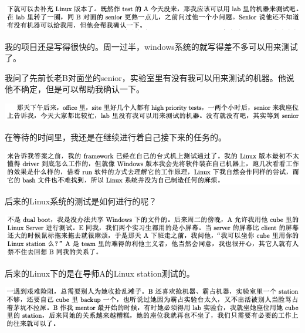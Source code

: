 \documentclass[9pt, b5paper]{article}
\begin{document}
\begin{center}
\includegraphics[width=.9\linewidth]{./pic/backups_plans_20210514_115800.png}
\end{center}

我的项目还是写得很快的。周一过半，windows系统的就写得差不多可以用来测试了。

我问了先前长老B对面坐的senior，实验室里有没有我可以用来测试的机器。他说他不确定，但是可以帮助我确认一下。 

\begin{center}
\includegraphics[width=.9\linewidth]{./pic/backups_plans_20210514_115922.png}
\end{center}

在等待的时间里，我还是在继续进行着自己接下来的任务的。 

\begin{center}
\includegraphics[width=.9\linewidth]{./pic/backups_plans_20210514_120100.png}
\end{center}

后来的Linux系统的测试是如何进行的呢？

\begin{center}
\includegraphics[width=.9\linewidth]{./pic/backups_plans_20210514_120348.png}
\end{center}

后来的Linux下的是在导师A的Linux station测试的。

\begin{center}
\includegraphics[width=.9\linewidth]{./pic/backups_plans_20210514_120603.png}
\end{center}
\end{document}
